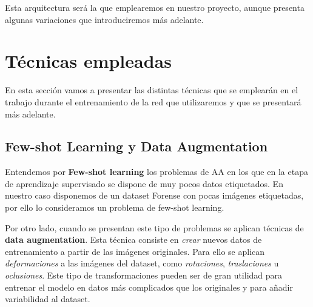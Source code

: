             \noindent Esta arquitectura será la que emplearemos en nuestro proyecto, aunque presenta algunas variaciones que introduciremos más adelante.

\section{Técnicas empleadas}
    \noindent En esta sección vamos a presentar las distintas técnicas que se emplearán en el trabajo durante el entrenamiento de la red que utilizaremos y que se presentará más adelante. 

    \subsection{Few-shot Learning y Data Augmentation} \label{sub:data_augmentation}
        \noindent Entendemos por \textbf{Few-shot learning} los problemas de AA en los que en la etapa de aprendizaje supervisado se dispone de muy pocos datos etiquetados. En nuestro caso disponemos de un dataset Forense con pocas imágenes etiquetadas, por ello lo consideramos un problema de few-shot learning.

        \medskip

        \noindent Por otro lado, cuando se presentan este tipo de problemas se aplican técnicas de \textbf{data augmentation}. Esta técnica consiste en \textit{crear} nuevos datos de entrenamiento a partir de las imágenes originales. Para ello se aplican \textit{deformaciones} a las imágenes del dataset, como \textit{rotaciones}, \textit{traslaciones} u \textit{oclusiones}. Este tipo de transformaciones pueden ser de gran utilidad para entrenar el modelo en datos más complicados que los originales y para añadir variabilidad al dataset.
        
\endinput


